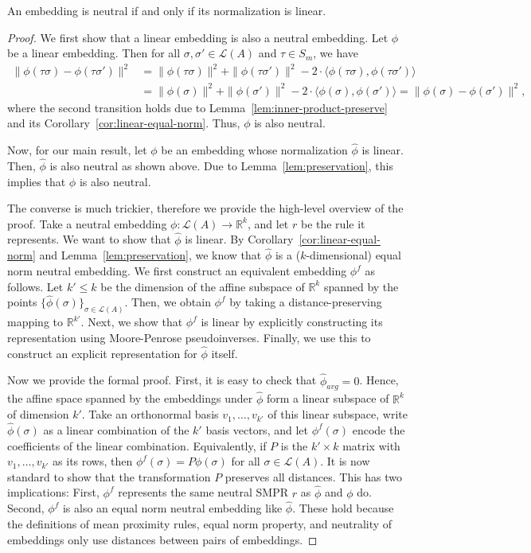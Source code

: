 \documentclass[prodmode]{acmsmall-ec14}
\newcommand{\calL}{{\mathcal{L}}}
\newcommand{\rank}{{\calL(A)}}
\begin{document}
\begin{theorem}
An embedding is neutral if and only if its normalization is linear. 
\label{thm:neutral-linear}
\end{theorem}
\begin{proof}
We first show that a linear embedding is also a neutral embedding. Let $\phi$ be a linear embedding. Then for all $\sigma,\sigma' \in \rank$ and $\tau \in S_m$, we have
\begin{align*}
\|\phi(\tau \sigma)-\phi(\tau \sigma')\|^2 &= \|\phi(\tau \sigma)\|^2 + \|\phi(\tau \sigma')\|^2 - 2\cdot \langle \phi(\tau \sigma), \phi(\tau \sigma') \rangle \\
&= \|\phi(\sigma)\|^2 + \|\phi(\sigma')\|^2 - 2\cdot \langle \phi(\sigma), \phi(\sigma') \rangle = \|\phi(\sigma)-\phi(\sigma')\|^2,
\end{align*}
where the second transition holds due to Lemma~\ref{lem:inner-product-preserve} and its Corollary~\ref{cor:linear-equal-norm}. Thus, $\phi$ is also neutral. 

Now, for our main result, let $\phi$ be an embedding whose normalization $\hat{\phi}$ is linear. Then, $\hat{\phi}$ is also neutral as shown above. Due to Lemma~\ref{lem:preservation}, this implies that $\phi$ is also neutral.

The converse is much trickier, therefore we provide the high-level overview of the proof. Take a neutral embedding $\phi : \rank \rightarrow \mathbb{R}^k$, and let $r$ be the rule it represents. We want to show that $\hat{\phi}$ is linear. By Corollary~\ref{cor:linear-equal-norm} and Lemma~\ref{lem:preservation}, we know that $\hat{\phi}$ is a ($k$-dimensional) equal norm neutral embedding. We first construct an equivalent embedding $\phi^f$ as follows. Let $k' \le k$ be the dimension of the affine subspace of $\mathbb{R}^k$ spanned by the points $\{\hat{\phi}(\sigma)\}_{\sigma \in \rank}$. Then, we obtain $\phi^f$ by taking a distance-preserving mapping to $\mathbb{R}^{k'}$. Next, we show that $\phi^f$ is linear by explicitly constructing its representation using Moore-Penrose pseudoinverses. Finally, we use this to construct an explicit representation for $\hat{\phi}$ itself. 

Now we provide the formal proof. First, it is easy to check that $\hat{\phi}_{avg} = 0$. Hence, the affine space spanned by the embeddings under $\hat{\phi}$ form a linear subspace of $\mathbb{R}^k$ of dimension $k'$. Take an orthonormal basis $v_1,\ldots,v_{k'}$ of this linear subspace, write $\hat{\phi}(\sigma)$ as a linear combination of the $k'$ basis vectors, and let $\phi^f(\sigma)$ encode the coefficients of the linear combination. Equivalently, if $P$ is the $k' \times k$ matrix with $v_1,\ldots,v_{k'}$ as its rows, then $\phi^f(\sigma) = P \phi(\sigma)$ for all $\sigma \in \rank$. It is now standard to show that the transformation $P$ preserves all distances. This has two implications: First, $\phi^f$ represents the same neutral SMPR $r$ as $\hat{\phi}$ and $\phi$ do. Second, $\phi^f$ is also an equal norm neutral embedding like $\hat{\phi}$. These hold because the definitions of mean proximity rules, equal norm property, and neutrality of embeddings only use distances between pairs of embeddings. 


\end{proof}
\end{document}
